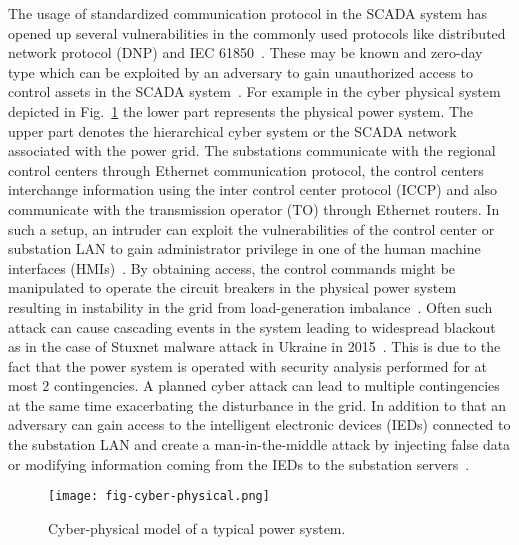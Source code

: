The usage of standardized communication protocol in the SCADA system has opened up several vulnerabilities in the commonly used protocols like distributed network protocol (DNP) and IEC 61850~\cite{iec61850}. These may be known and zero-day type which can be exploited by an adversary to gain unauthorized access to control assets in the SCADA system~\cite{wang1}. For example in the cyber physical system depicted in Fig.~\ref{fig:cyber-physical} the lower part represents the physical power system. The upper part denotes the hierarchical cyber system or the SCADA network associated with the power grid. The substations communicate with the regional control centers through Ethernet communication protocol, the control centers interchange information using the inter control center protocol (ICCP) and also communicate with the transmission operator (TO) through Ethernet routers. In such a setup, an intruder can exploit the vulnerabilities of the control center or substation LAN to gain administrator privilege in one of the human machine interfaces (HMIs)~\cite{ten_main}. By obtaining access, the control commands might be manipulated to operate the circuit breakers in the physical power system resulting in instability in the grid from load-generation imbalance~\cite{attack}. Often such attack can cause cascading events in the system leading to widespread blackout as in the case of Stuxnet malware attack in Ukraine in 2015~\cite{ukraine1,ukraine2}. This is due to the fact that the power system is operated with security analysis performed for at most $2$ contingencies. A planned cyber attack can lead to multiple contingencies at the same time exacerbating the disturbance in the grid. In addition to that an adversary can gain access to the intelligent electronic devices (IEDs) connected to the substation LAN and create a man-in-the-middle attack by injecting false data or modifying information coming from the IEDs to the substation servers~\cite{maninmiddle}.
\begin{figure}
	\centering
	\texttt{[image: fig-cyber-physical.png]}
	\caption{Cyber-physical model of a typical power system.}
	\label{fig:cyber-physical}
\end{figure}

